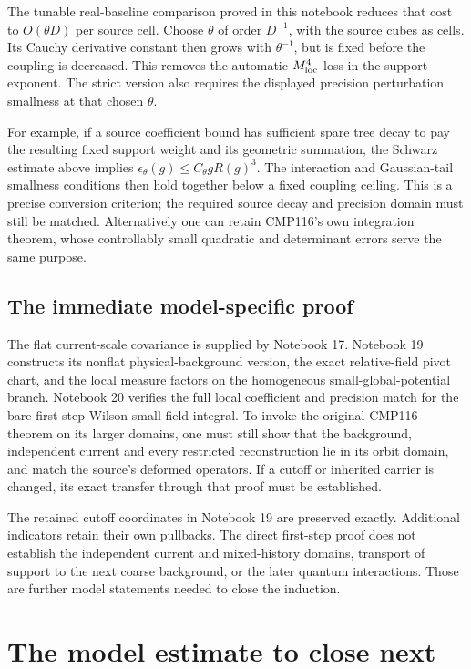 \documentclass[11pt]{article}
\theoremstyle{remark}
\begin{document}
The tunable real-baseline comparison proved in this notebook
reduces that cost to $O(\theta D)$ per source cell. Choose
$\theta$ of order $D^{-1}$, with the source cubes as cells.
Its Cauchy derivative constant then grows with $\theta^{-1}$,
but is fixed before the coupling is decreased. This removes
the automatic $M_{\rm loc}^4$ loss in the support exponent.
The strict version also requires the displayed precision
perturbation smallness at that chosen $\theta$.

For example, if a source coefficient bound has sufficient spare
tree decay to pay the resulting fixed support weight and its
geometric summation, the Schwarz estimate above implies
$\epsilon_\theta(g)\le C_\theta gR(g)^3$.
The interaction and Gaussian-tail smallness conditions then hold
together below a fixed coupling ceiling. This is a precise
conversion criterion; the required source decay and precision
domain must still be matched. Alternatively one can retain
CMP116's own integration theorem, whose controllably small
quadratic and determinant errors serve the same purpose.

\subsection{The immediate model-specific proof}

The flat current-scale covariance is supplied by Notebook 17.
Notebook 19 constructs its nonflat physical-background version,
the exact relative-field pivot chart, and the local measure
factors on the homogeneous small-global-potential branch.
Notebook 20 verifies the full local coefficient and precision
match for the bare first-step Wilson small-field integral.
To invoke the original CMP116 theorem on its larger domains,
one must still show that the background, independent current
and every restricted reconstruction lie in its orbit domain,
and match the source's deformed operators.
If a cutoff or inherited carrier is changed, its exact transfer
through that proof must be established.

The retained cutoff coordinates in Notebook 19 are preserved
exactly. Additional indicators retain their own pullbacks.
The direct first-step proof does not establish the independent
current and mixed-history domains, transport of support to the
next coarse background, or the later quantum interactions.
Those are further model statements needed to close the induction.


\section{The model estimate to close next}
\label{oc18-next}
\end{document}
